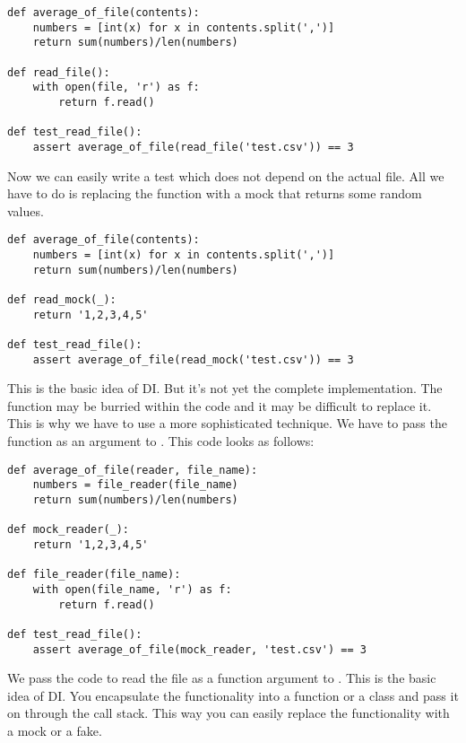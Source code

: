 \begin{programcode}{}
\begin{verbatim}
def average_of_file(contents):
    numbers = [int(x) for x in contents.split(',')]
    return sum(numbers)/len(numbers)

def read_file():
    with open(file, 'r') as f:
        return f.read()

def test_read_file():
    assert average_of_file(read_file('test.csv')) == 3
\end{verbatim}
\end{programcode}

Now we can easily write a test which does not depend on the actual file. All we have to do is replacing the  function with a mock that returns some random values.

\begin{programcode}{}
\begin{verbatim}
def average_of_file(contents):
    numbers = [int(x) for x in contents.split(',')]
    return sum(numbers)/len(numbers)

def read_mock(_):
    return '1,2,3,4,5'

def test_read_file():
    assert average_of_file(read_mock('test.csv')) == 3
\end{verbatim}
\end{programcode}

This is the basic idea of DI. But it's not yet the complete implementation. The  function may be burried within the code and it may be difficult to replace it. This is why we have to use a more sophisticated technique. We have to pass the function as an argument to . This code looks as follows:

\begin{programcode}{}\label{prog:mock_reader}
\begin{verbatim}
def average_of_file(reader, file_name):
    numbers = file_reader(file_name)
    return sum(numbers)/len(numbers)

def mock_reader(_):
    return '1,2,3,4,5'

def file_reader(file_name):
    with open(file_name, 'r') as f:
        return f.read()

def test_read_file():
    assert average_of_file(mock_reader, 'test.csv') == 3
\end{verbatim}
\end{programcode}

We pass the code to read the file as a function argument to . This is the basic idea of DI. You encapsulate the functionality into a function or a class and pass it on through the call stack. This way you can easily replace the functionality with a mock or a fake.

